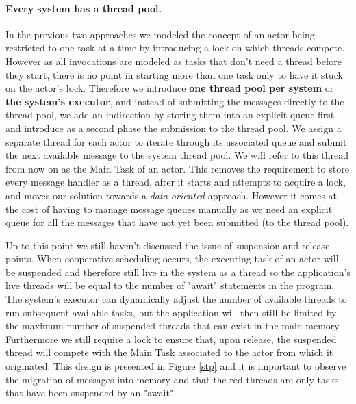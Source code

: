 \paragraph{Every system has a thread pool.}
In the previous two approaches we modeled the concept of an actor being restricted to one task at a time by introducing a lock on which threads compete. However as all invocations are modeled as tasks that don't need a thread before they start, there is no point in starting more than one task only to have it stuck on the actor's lock. Therefore we introduce \textbf{one thread pool per system} or \textbf{the system's executor}, and instead of submitting the messages directly to the thread pool, we add an indirection by storing them into an explicit queue first and introduce as a second phase the submission to the thread pool. We assign a separate thread for each actor to iterate through its associated queue and submit the next available message to the system thread pool. We will refer to this thread from now on as the Main Task of an actor. This removes the requirement to store every message handler as a thread, after it starts and attempts to acquire a lock, and moves our solution towards a \textit{data-oriented} approach.  However it comes at the cost of having to manage message queues manually as we need an explicit queue for all the messages that have not yet been submitted (to the thread pool). 
\par Up to this point we still haven't discussed the issue of suspension and release points. When cooperative scheduling occurs, the executing task of an actor will be suspended and therefore still live in the system as a thread so the application's live threads will be equal to the number of "await" statements in the program. The system's executor can dynamically adjust the number of available threads to run subsequent available tasks, but the application will then still be limited by the maximum number of suspended threads that can exist in the main memory. Furthermore we still require a lock to ensure that, upon release, the suspended thread will compete with the Main Task associated to the actor from which it originated. This design is presented in Figure \ref{stp} and it is important to observe the migration of messages into memory and that the red threads are only tasks that have been suspended by an "await".



